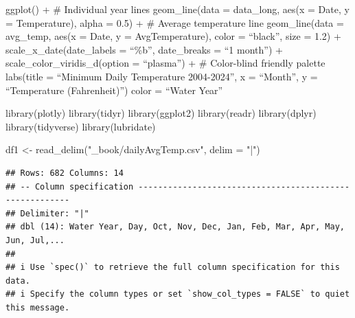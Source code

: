 \documentclass[
]{book}
\newenvironment{Shaded}{\begin{snugshade}}{\end{snugshade}}
\newcommand{\AttributeTok}[1]{\textcolor[rgb]{0.77,0.63,0.00}{#1}}
\newcommand{\FunctionTok}[1]{\textcolor[rgb]{0.00,0.00,0.00}{#1}}
\newcommand{\NormalTok}[1]{#1}
\newcommand{\OtherTok}[1]{\textcolor[rgb]{0.56,0.35,0.01}{#1}}
\newcommand{\StringTok}[1]{\textcolor[rgb]{0.31,0.60,0.02}{#1}}
\theoremstyle{definition}
\theoremstyle{definition}
\theoremstyle{definition}
\theoremstyle{definition}
\theoremstyle{remark}
\begin{document}
ggplot() +
\# Individual year lines
geom\_line(data = data\_long,
aes(x = Date, y = Temperature),
alpha = 0.5) +
\# Average temperature line
geom\_line(data = avg\_temp,
aes(x = Date, y = AvgTemperature),
color = ``black'', size = 1.2) +
scale\_x\_date(date\_labels = ``\%b'', date\_breaks = ``1 month'') +
scale\_color\_viridis\_d(option = ``plasma'') + \# Color-blind friendly palette
labs(title = ``Minimum Daily Temperature 2004-2024'',
x = ``Month'',
y = ``Temperature (Fahrenheit)'')
color = ``Water Year''

\begin{Shaded}
\begin{Highlighting}[]
\FunctionTok{library}\NormalTok{(plotly)}
\FunctionTok{library}\NormalTok{(tidyr)}
\FunctionTok{library}\NormalTok{(ggplot2)}
\FunctionTok{library}\NormalTok{(readr)}
\FunctionTok{library}\NormalTok{(dplyr)}
\FunctionTok{library}\NormalTok{(tidyverse)}
\FunctionTok{library}\NormalTok{(lubridate)}

\NormalTok{df1 }\OtherTok{\textless{}{-}} \FunctionTok{read\_delim}\NormalTok{(}\StringTok{"\_book/dailyAvgTemp.csv"}\NormalTok{, }\AttributeTok{delim =} \StringTok{"|"}\NormalTok{)}
\end{Highlighting}
\end{Shaded}

\begin{verbatim}
## Rows: 682 Columns: 14
## -- Column specification --------------------------------------------------------
## Delimiter: "|"
## dbl (14): Water Year, Day, Oct, Nov, Dec, Jan, Feb, Mar, Apr, May, Jun, Jul,...
## 
## i Use `spec()` to retrieve the full column specification for this data.
## i Specify the column types or set `show_col_types = FALSE` to quiet this message.
\end{verbatim}
\end{document}
